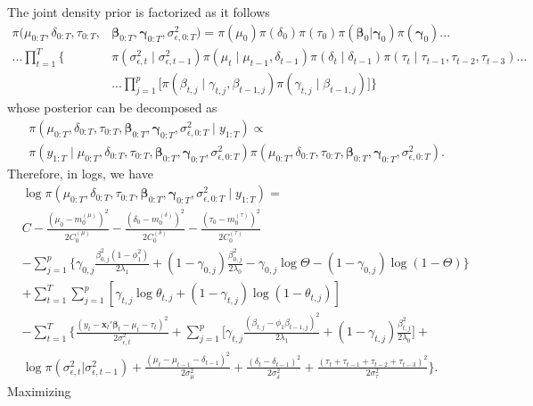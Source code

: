 \documentclass[
  12pt,
]{book}
\theoremstyle{break}
\theoremstyle{nonumberplain}
\begin{document}
The joint density prior is factorized as it follows \begin{align*}
 \pi(\mu_{0:T},\delta_{0:T},\tau_{0:T},&\boldsymbol{\beta}_{0:T},\boldsymbol{\gamma}_{0:T},\sigma^{2}_{\epsilon,0:T}) = \pi(\mu_{0})\pi(\delta_{0})\pi(\tau_{0})\pi(\boldsymbol{\beta}_{0}|\boldsymbol{\gamma}_{0})\pi(\boldsymbol{\gamma}_{0})... \\ 
...\prod_{t=1}^{T}\bigg\{ & \pi(\sigma^{2}_{\epsilon,t}\mid\sigma^{2}_{\epsilon,t-1})\pi(\mu_{t}\mid\mu_{t-1},\delta_{t-1})\pi(\delta_{t}\mid\delta_{t-1})\pi(\tau_{t}\mid\tau_{t-1},\tau_{t-2},\tau_{t-3})... \\
& ... \prod_{j=1}^{p}\bigg[\pi(\beta_{t,j}\mid\gamma_{t,j},\beta_{t-1,j})\pi(\gamma_{t,j}\mid\beta_{t-1,j})\bigg]\bigg\}
\end{align*} whose posterior can be decomposed as \begin{align*}
& \pi(\mu_{0:T},\delta_{0:T},\tau_{0:T},\boldsymbol{\beta}_{0:T},\boldsymbol{\gamma}_{0:T},\sigma^{2}_{\epsilon,0:T}\mid y_{1:T}) \propto \\ & \pi(y_{1:T}\mid \mu_{0:T},\delta_{0:T},\tau_{0:T},\boldsymbol{\beta}_{0:T},\boldsymbol{\gamma}_{0:T},\sigma^{2}_{\epsilon,0:T})\pi(\mu_{0:T},\delta_{0:T},\tau_{0:T},\boldsymbol{\beta}_{0:T},\boldsymbol{\gamma}_{0:T},\sigma^{2}_{\epsilon,0:T}).
\end{align*} Therefore, in logs, we have \begin{align*}
& \log\pi(\mu_{0:T},\delta_{0:T},\tau_{0:T},\boldsymbol{\beta}_{0:T},\boldsymbol{\gamma}_{0:T},\sigma^{2}_{\epsilon,0:T}\mid y_{1:T}) =\\
& C - \frac{(\mu_{0}-m_{0}^{(\mu)})^{2}}{2C_{0}^{(\mu)}}- \frac{(\delta_{0}-m_{0}^{(\delta)})^{2}}{2C_{0}^{(\delta)}}- \frac{(\tau_{0}-m_{0}^{(\tau)})^{2}}{2C_{0}^{(\tau)}} \\
& - \sum_{j=1}^{p}\bigg\{\gamma_{0,j}\frac{\beta_{0,j}^{2}(1-\phi_{1}^{2})}{2\lambda_{1}}+(1-\gamma_{0,j})\frac{\beta_{0,j}^{2}}{2\lambda_{0}}-\gamma_{0,j}\log\Theta-(1-\gamma_{0,j})\log(1-\Theta)\bigg\} \\
& +\sum_{t=1}^{T}\sum_{j=1}^{p}[\gamma_{t,j}\log \theta_{t,j}+(1-\gamma_{t,j})\log(1-\theta_{t,j})] \\
& - \sum_{t=1}^{T}\bigg\{\frac{(y_{t}-\boldsymbol{x}_{t}'\boldsymbol{\beta}_{t}-\mu_{t}-\tau_{t})^{2}}{2\sigma^{2}_{\epsilon,t}}+\sum_{j=1}^{p}\bigg[\gamma_{t,j}\frac{(\beta_{t,j}-\phi_{1}\beta_{t-1,j})^{2}}{2\lambda_{1}}+(1-\gamma_{t,j})\frac{\beta_{t,j}^{2}}{2\lambda_{0}}\bigg]+\\
& \log\pi(\sigma^2_{\epsilon,t}|\sigma^2_{\epsilon,t-1})+\frac{(\mu_{t}-\mu_{t-1}-\delta_{t-1})^{2}}{2\sigma^{2}_{\mu}}+\frac{(\delta_{t}-\delta_{t-1})^{2}}{2\sigma^{2}_{\delta}}+\frac{(\tau_{t}+\tau_{t-1}+\tau_{t-2}+\tau_{t-3})^{2}}{2\sigma^{2}_{\tau}} \bigg\}.
\end{align*} Maximizing
\end{document}
